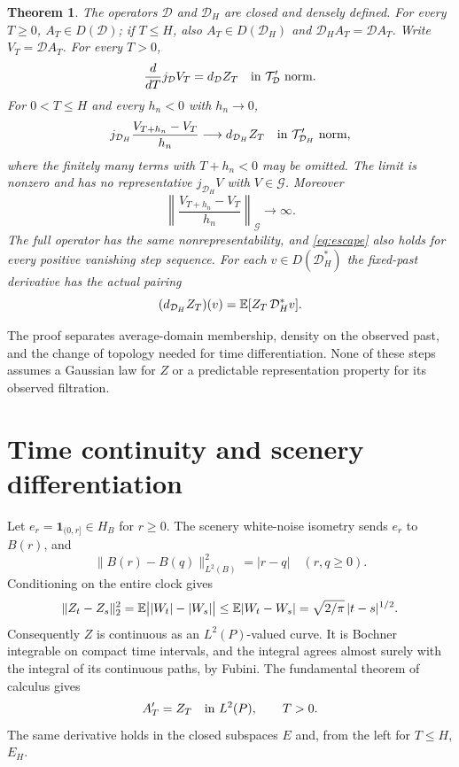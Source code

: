 \documentclass[11pt]{article}
\newtheorem{theorem}{Theorem}[section]
\newcommand{\D}{\mathcal D}\newcommand{\G}{\mathcal G}
\begin{document}
\begin{theorem}\label{thm:main}
The operators $\D$ and $\D_H$ are closed and densely defined. For every
$T\geq0$, $A_T\in D(\D)$; if $T\leq H$, also $A_T\in D(\D_H)$ and
$\D_H A_T=\D A_T$. Write $V_T=\D A_T$. For every $T>0$,
\begin{equation}\label{eq:fulltime}
 \frac{d}{dT}j_{\D}V_T=d_{\D}Z_T
 \quad\hbox{in }\mathcal T_{\D}'\hbox{ norm}.
\end{equation}
For $0<T\leq H$ and every $h_n<0$ with $h_n\to0$,
\begin{equation}\label{eq:left}
 j_{\D_H}\frac{V_{T+h_n}-V_T}{h_n}
 \longrightarrow d_{\D_H}Z_T
 \quad\hbox{in }\mathcal T_{\D_H}'\hbox{ norm},
\end{equation}
where the finitely many terms with $T+h_n<0$ may be omitted. The limit is
nonzero and has no representative $j_{\D_H}V$ with $V\in\G$. Moreover
\begin{equation}\label{eq:escape}
 \left\|\frac{V_{T+h_n}-V_T}{h_n}\right\|_{\G}\longrightarrow\infty.
\end{equation}
The full operator has the same nonrepresentability, and
\eqref{eq:escape} also holds for every positive vanishing step sequence.
For each $v\in D(\D_H^*)$ the fixed-past derivative has the actual pairing
\begin{equation}\label{eq:actual}
 (d_{\D_H}Z_T)(v)=\E[Z_T\,\D_H^*v].
\end{equation}
\end{theorem}

The proof separates average-domain membership, density on the observed
past, and the change of topology needed for time differentiation. None
of these steps assumes a Gaussian law for $Z$ or a predictable
representation property for its observed filtration.

\section{Time continuity and scenery differentiation}
Let $e_r=\mathbf1_{(0,r]}\in H_B$ for $r\geq0$. The scenery white-noise
isometry sends $e_r$ to $B(r)$, and
\[
 \|B(r)-B(q)\|_{L^2(B)}^2=|r-q|\quad(r,q\geq0).
\]
Conditioning on the entire clock gives
\begin{equation}\label{eq:continuity}
 \|Z_t-Z_s\|_2^2
 =\mathbb E\bigl||W_t|-|W_s|\bigr|
 \leq\mathbb E|W_t-W_s|
 =\sqrt{2/\pi}\,|t-s|^{1/2}.
\end{equation}
Consequently $Z$ is continuous as an $L^2(P)$-valued curve. It is Bochner
integrable on compact time intervals, and the integral agrees almost
surely with the integral of its continuous paths, by Fubini. The
fundamental theorem of calculus gives
\begin{equation}\label{eq:FTC}
 A'_T=Z_T\quad\hbox{in }L^2(P),\qquad T>0.
\end{equation}
The same derivative holds in the closed subspaces $E$ and, from the
left for $T\leq H$, $E_H$.
\end{document}
